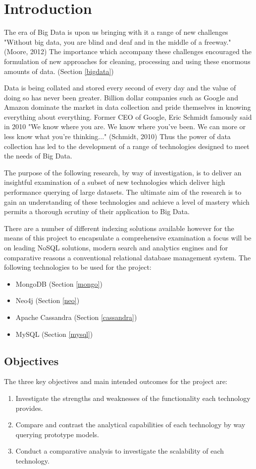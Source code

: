 
\chapter{Introduction}\label{intro}
The era of Big Data is upon us bringing with it a range of new challenges "Without big data, you are blind and deaf and in the middle of a freeway." (Moore, 2012) The importance which accompany these challenges encouraged the formulation of new approaches for cleaning, processing and using these enormous amounts of data. (Section \ref{bigdata})

Data is being collated and stored every second of every day and the value of doing so has never been greater. Billion dollar companies such as Google and Amazon dominate the market in data collection and pride themselves in knowing everything about everything. Former CEO of Google, Eric Schmidt famously said in 2010 "We know where you are. We know where you've been. We can more or less know what you're thinking..." (Schmidt, 2010) Thus the power of data collection has led to the development of a range of technologies designed to meet the needs of Big Data.

The purpose of the following research, by way of investigation, is to deliver an insightful examination of a subset of new technologies which deliver high performance querying of large datasets. The ultimate aim of the research is to gain an understanding of these technologies and achieve a level of mastery which permits a thorough scrutiny of their application to Big Data.

There are a number of different indexing solutions available however for the means of this project to encapsulate a comprehensive examination a focus will be on leading NoSQL solutions, modern search and analytics engines and for comparative reasons a conventional relational database management system. The following technologies to be used for the project: 
\begin{itemize}
\item MongoDB (Section \ref{mongo})
\item Neo4j (Section \ref{neo})
\item Apache Cassandra (Section \ref{cassandra})
\item MySQL (Section \ref{mysql})
\end{itemize}

\section{Objectives}\label{objectives}
The three key objectives and main intended outcomes for the project are:
\begin{enumerate}
\item Investigate the strengths and weaknesses of the functionality each technology provides.
\item Compare and contrast the analytical capabilities of each technology by way querying prototype models.
\item Conduct a comparative analysis to investigate the scalability of each technology.
\end{enumerate}

